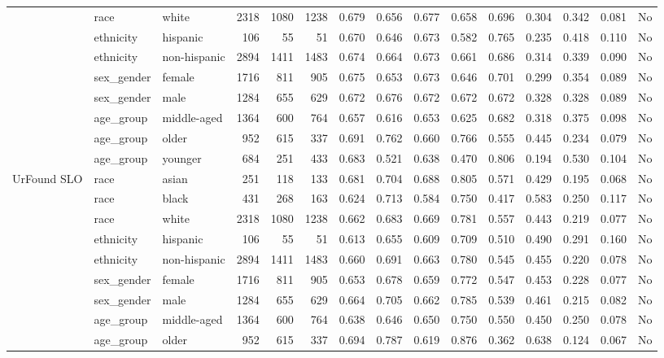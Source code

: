 \begin{longtable}{@{}lllrrrrrrrrrrrr@{}}
 & race & white & 2318 & 1080 & 1238 & 0.679 & 0.656 & 0.677 & 0.658 & 0.696 & 0.304 & 0.342 & 0.081 & No \\
 & ethnicity & hispanic & 106 & 55 & 51 & 0.670 & 0.646 & 0.673 & 0.582 & 0.765 & 0.235 & 0.418 & 0.110 & No \\
 & ethnicity & non-hispanic & 2894 & 1411 & 1483 & 0.674 & 0.664 & 0.673 & 0.661 & 0.686 & 0.314 & 0.339 & 0.090 & No \\
 & sex\_gender & female & 1716 & 811 & 905 & 0.675 & 0.653 & 0.673 & 0.646 & 0.701 & 0.299 & 0.354 & 0.089 & No \\
 & sex\_gender & male & 1284 & 655 & 629 & 0.672 & 0.676 & 0.672 & 0.672 & 0.672 & 0.328 & 0.328 & 0.089 & No \\
 & age\_group & middle-aged & 1364 & 600 & 764 & 0.657 & 0.616 & 0.653 & 0.625 & 0.682 & 0.318 & 0.375 & 0.098 & No \\
 & age\_group & older & 952 & 615 & 337 & 0.691 & 0.762 & 0.660 & 0.766 & 0.555 & 0.445 & 0.234 & 0.079 & No \\
 & age\_group & younger & 684 & 251 & 433 & 0.683 & 0.521 & 0.638 & 0.470 & 0.806 & 0.194 & 0.530 & 0.104 & No \\
UrFound SLO & race & asian & 251 & 118 & 133 & 0.681 & 0.704 & 0.688 & 0.805 & 0.571 & 0.429 & 0.195 & 0.068 & No \\
 & race & black & 431 & 268 & 163 & 0.624 & 0.713 & 0.584 & 0.750 & 0.417 & 0.583 & 0.250 & 0.117 & No \\
 & race & white & 2318 & 1080 & 1238 & 0.662 & 0.683 & 0.669 & 0.781 & 0.557 & 0.443 & 0.219 & 0.077 & No \\
 & ethnicity & hispanic & 106 & 55 & 51 & 0.613 & 0.655 & 0.609 & 0.709 & 0.510 & 0.490 & 0.291 & 0.160 & No \\
 & ethnicity & non-hispanic & 2894 & 1411 & 1483 & 0.660 & 0.691 & 0.663 & 0.780 & 0.545 & 0.455 & 0.220 & 0.078 & No \\
 & sex\_gender & female & 1716 & 811 & 905 & 0.653 & 0.678 & 0.659 & 0.772 & 0.547 & 0.453 & 0.228 & 0.077 & No \\
 & sex\_gender & male & 1284 & 655 & 629 & 0.664 & 0.705 & 0.662 & 0.785 & 0.539 & 0.461 & 0.215 & 0.082 & No \\
 & age\_group & middle-aged & 1364 & 600 & 764 & 0.638 & 0.646 & 0.650 & 0.750 & 0.550 & 0.450 & 0.250 & 0.078 & No \\
 & age\_group & older & 952 & 615 & 337 & 0.694 & 0.787 & 0.619 & 0.876 & 0.362 & 0.638 & 0.124 & 0.067 & No \\

\end{longtable}
